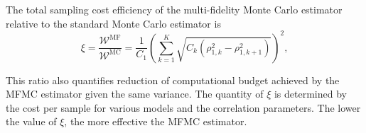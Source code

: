 

The total sampling cost efficiency of the multi-fidelity Monte Carlo estimator relative to the standard Monte Carlo estimator is
%
\begin{equation}\label{eq:MFMC_sampling_cost_efficiency}
    \xi = \frac{\mathcal{W}^\text{MF}}{\mathcal{W}^\text{MC}} = \frac{1}{C_1} \left(\sum_{k=1}^K\sqrt{C_k\left(\rho_{1,k}^2 - \rho_{1,k+1}^2\right)}\right)^2,
\end{equation}
%

This ratio also quantifies reduction of computational budget achieved by the MFMC estimator given the same variance. The quantity of $\xi$ is determined by the cost per sample for various models and the correlation parameters. The lower the value of $\xi$, the more effective the MFMC estimator.




